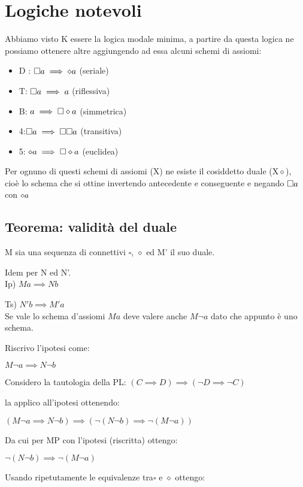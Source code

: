 \section{Logiche notevoli}

Abbiamo visto K essere la logica modale minima, a partire da questa
logica ne possiamo ottenere altre aggiungendo ad essa alcuni schemi
di assiomi:
\begin{itemize}
\item D : $\square a\implies\diamond a$ (seriale)
\item T: $\square a\implies a$ (riflessiva)
\item B: $a\implies\square\diamond a$ (simmetrica)
\item 4:$\square a\implies\square\square a$ (transitiva)
\item 5: $\diamond a\implies\square\diamond a$ (euclidea)
\end{itemize}
Per ognuno di questi schemi di assiomi (X) ne esiste il cosiddetto
duale (X$\diamond$), cioè lo schema che si ottine invertendo antecedente
e conseguente e negando $\square a$ con $\diamond a$


\subsection{Teorema: validità del duale }

M sia una sequenza di connettivi $\square$, $\diamond$ ed M' il
suo duale.

Idem per N ed N'.\\


Ip) $Ma\implies Nb$

Ts) $N'b\implies M'a$\\


Se vale lo schema d'assiomi $Ma$ deve valere anche $M\neg a$ dato
che appunto è uno schema.

Riscrivo l'ipotesi come:

$M\neg a\implies N\neg b$

Considero la tautologia della PL: $(C\implies D)\implies(\neg D\implies\neg C)$

la applico all'ipotesi ottenendo:

$(M\neg a\implies N\neg b)\implies(\neg(N\neg b)\implies\neg(M\neg a))$

Da cui per MP con l'ipotesi (riscritta) ottengo:

$\neg(N\neg b)\implies\neg(M\neg a)$

Usando ripetutamente le equivalenze tra$\square$ e $\diamond$ ottengo:

